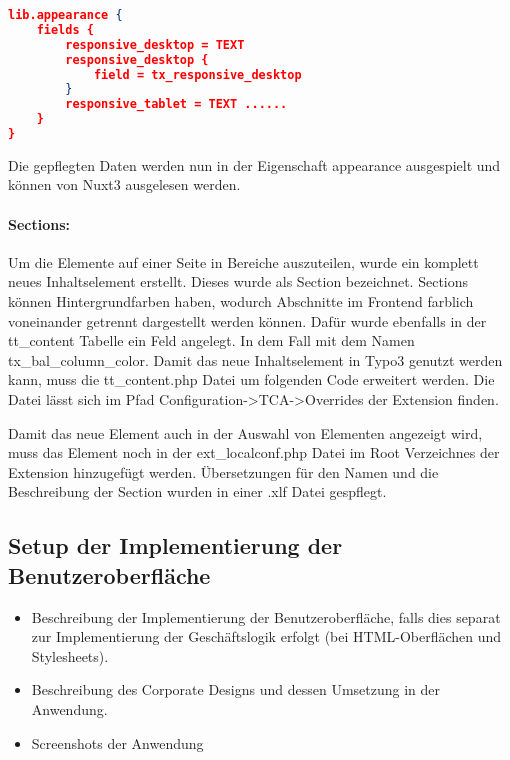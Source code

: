 \begin{lstlisting}[language=json,firstnumber=1]
lib.appearance {
    fields {
        responsive_desktop = TEXT
        responsive_desktop {
            field = tx_responsive_desktop
        }
        responsive_tablet = TEXT ......
    }
}
\end{lstlisting}

Die gepflegten Daten werden nun in der Eigenschaft appearance ausgespielt und können von Nuxt3 ausgelesen werden.

\paragraph{Sections:}
Um die Elemente auf einer Seite in Bereiche auszuteilen, wurde ein komplett neues Inhaltselement erstellt. Dieses wurde als Section bezeichnet. Sections können Hintergrundfarben haben, wodurch Abschnitte im Frontend farblich voneinander getrennt dargestellt werden können. Dafür wurde ebenfalls in der tt\_content Tabelle ein Feld angelegt. In dem Fall mit dem Namen tx\_bal\_column\_color. Damit das neue Inhaltselement in Typo3 genutzt werden kann, muss die tt\_content.php Datei um folgenden Code erweitert werden.  \newline Die Datei lässt sich im Pfad Configuration->TCA->Overrides der Extension finden.

Damit das neue Element auch in der Auswahl von Elementen angezeigt wird, muss das Element noch in der ext\_localconf.php Datei im Root Verzeichnes der Extension hinzugefügt werden.\newline {} \newline Übersetzungen für den Namen und die Beschreibung der Section wurden in einer .xlf Datei gespflegt.


\subsection{Setup der Implementierung der Benutzeroberfläche}
\label{sec:Setup der ImplementierungBenutzeroberflaeche}

\begin{itemize}
	\item Beschreibung der Implementierung der Benutzeroberfläche, falls dies separat zur Implementierung der Geschäftslogik erfolgt (\zB bei \acs{HTML}-Oberflächen und Stylesheets).
	\item \Ggfs Beschreibung des Corporate Designs und dessen Umsetzung in der Anwendung.
	\item Screenshots der Anwendung
\end{itemize}

